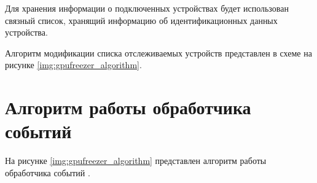Для хранения информации о подключенных устройствах будет использован связный список, хранящий информацию об идентификационных данных устройства.

Алгоритм модификации списка отслеживаемых устройств представлен в схеме на рисунке \ref{img:gpufreezer_algorithm}.

\section{Алгоритм работы обработчика событий}

На рисунке \ref{img:gpufreezer_algorithm} представлен алгоритм работы обработчика событий .

